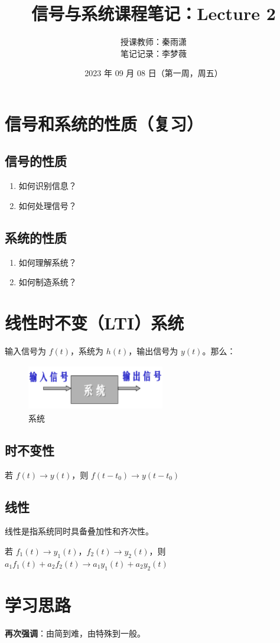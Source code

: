 \documentclass{ctexart}
\begin{document}
\title{信号与系统课程笔记：Lecture 2}
\author{授课教师：秦雨潇 \\
        笔记记录：李梦薇}
\date{2023 年 09 月 08 日（第一周，周五）}
\maketitle

\section{信号和系统的性质（复习）}
\subsection{信号的性质}
\begin{enumerate}[itemindent=2em,label=(\arabic*)]
    \item 如何识别信息？
    \item 如何处理信号？
\end{enumerate}
\subsection{系统的性质}
\begin{enumerate}[itemindent=2em,label=(\arabic*)]
    \item 如何理解系统？
    \item 如何制造系统？
\end{enumerate}

\section{线性时不变（LTI）系统}
输入信号为 $f(t)$，系统为 $h(t)$，输出信号为 $y(t)$。那么：
\begin{figure}[htbp]
    \centering
    \includegraphics[width=6cm,height=2cm]{系统.png}
    \caption{系统}
\end{figure}
\subsection{时不变性}
若 $f(t)\longrightarrow{y(t)}$，则 $f(t-t_0)\longrightarrow{y(t-t_0)}$
\subsection{线性}
线性是指系统同时具备叠加性和齐次性。\par
若 $f_1(t)\longrightarrow{y_1(t)}$，$f_2(t)\longrightarrow{y_2(t)}$，则 $a_1f_1(t)+a_2f_2(t)\longrightarrow{a_1y_1(t)+a_2y_2(t)}$

\section{学习思路}
\textbf{再次强调}：由简到难，由特殊到一般。
\end{document}
